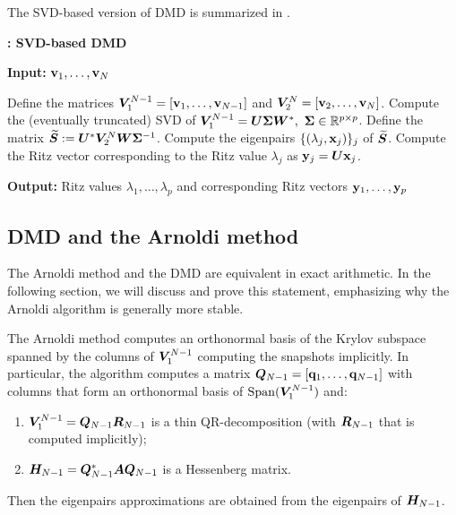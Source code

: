 The SVD-based version of DMD is summarized in .

\begin{algorithm}
\caption{\textbf{: SVD-based DMD}}
\label{alg_dmd}
\textbf{Input:} $\vb{v}_1,\dots, \vb{v}_N$
\begin{algorithmic}[1]
\State Define the matrices $\vb*{V}_1^{N-1} = \left[\vb{v}_1,\dots,\vb{v}_{N-1}\right]$ and $\vb*{V}_2^{N} = \left[\vb{v}_2,\dots,\vb{v}_{N}\right]$.
\State Compute the (eventually truncated) SVD of $\vb*{V}_1^{N-1} = \vb*{U}\vb*{\Sigma}\vb*{W}^*,\,\, \vb*{\Sigma}\in\mathbb{R}^{p\times p}$.
\State Define the matrix $\widetilde{\vb*{S}} := \vb*{U}^*\vb*{V}_2^N\vb*{W}\vb*{\Sigma}^{-1}$.
\State Compute the eigenpairs $\{(\lambda_j, \vb{x}_j)\}_j$ of $\widetilde{\vb*{S}}$.
\State Compute the Ritz vector corresponding to the Ritz value $\lambda_j$ as $\vb{y}_j = \vb*{U}\vb{x}_j$. 
\end{algorithmic}
\textbf{Output:} Ritz values $\lambda_1,\dots,\lambda_{p}$ and corresponding Ritz vectors $\vb{y}_1,\dots, \vb{y}_p$
\end{algorithm}


\subsection{DMD and the Arnoldi method}
\label{section_dmd_arnoldi}
The Arnoldi method and the DMD are equivalent in exact arithmetic. In the following section, we will discuss and prove this statement, emphasizing why the Arnoldi algorithm is generally more stable.

The Arnoldi method computes an orthonormal basis of the Krylov subspace spanned by the columns of $\vb*{V}_1^{N-1}$ computing the snapshots implicitly. In particular, the algorithm computes a matrix $\vb*{Q}_{N-1} = \left[\vb{q}_1,\dots, \vb{q}_{N-1}\right]$ with columns that form an orthonormal basis of $\mathrm{Span}{(\vb*{V}_1^{N-1})}$ and: 
\begin{enumerate}[label=(\roman*)]
    \item $\vb*{V}_1^{N-1} = \vb*{Q}_{N-1} \vb*{R}_{N-1}$ is a thin QR-decomposition (with $\vb*{R}_{N-1}$ that is computed implicitly);
    \item $\vb*{H}_{N-1} = \vb*{Q}_{N-1}^* \vb*{A} \vb*{Q}_{N-1}$ is a Hessenberg matrix.
\end{enumerate}
Then the eigenpairs approximations are obtained from the eigenpairs of $\vb*{H}_{N-1}$.

